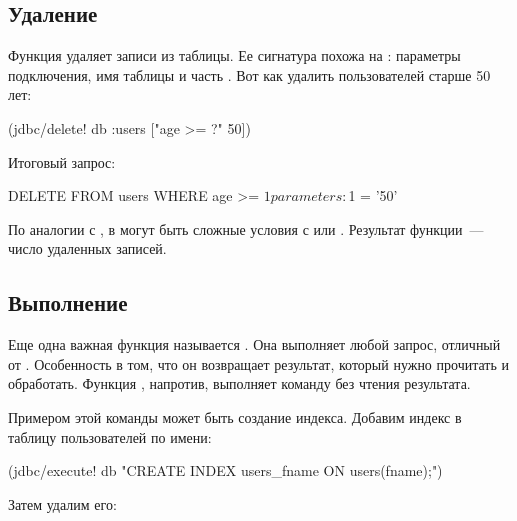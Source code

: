 \subsection{Удаление}


Функция  удаляет записи из таблицы. Ее сигнатура похожа на : параметры подключения, имя таблицы и часть . Вот как удалить пользователей старше 50 лет:

\begin{english}
  \begin{clojure}
(jdbc/delete! db :users ["age >= ?" 50])
  \end{clojure}
\end{english}

Итоговый запрос:

\begin{english}
  \begin{sql}
DELETE FROM users WHERE age >= $1
parameters: $1 = '50'
  \end{sql}
\end{english}

По аналогии с , в  могут быть сложные условия с  или . Результат функции~--- число удаленных записей.

\subsection{Выполнение}


Еще одна важная функция называется . Она выполняет любой запрос, отличный от . Особенность  в том, что он возвращает результат, который нужно прочитать и обработать. Функция , напротив, выполняет команду без чтения результата.


Примером этой команды может быть создание индекса. Добавим индекс в таблицу пользователей по имени:

\begin{english}
  \begin{clojure}
(jdbc/execute! db
  "CREATE INDEX users_fname ON users(fname);")
  \end{clojure}
\end{english}

Затем удалим его:

